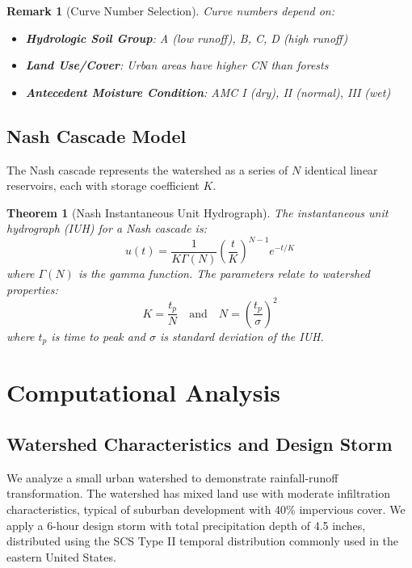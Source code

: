 \documentclass[a4paper, 11pt]{article}
\newtheorem{theorem}{Theorem}[section]
\newtheorem{remark}{Remark}[section]
\begin{document}
\begin{remark}[Curve Number Selection]
Curve numbers depend on:
\begin{itemize}
\item \textbf{Hydrologic Soil Group}: A (low runoff), B, C, D (high runoff)
\item \textbf{Land Use/Cover}: Urban areas have higher CN than forests
\item \textbf{Antecedent Moisture Condition}: AMC I (dry), II (normal), III (wet)
\end{itemize}
\end{remark}

\subsection{Nash Cascade Model}

The Nash cascade represents the watershed as a series of $N$ identical linear reservoirs,
each with storage coefficient $K$.

\begin{theorem}[Nash Instantaneous Unit Hydrograph]
The instantaneous unit hydrograph (IUH) for a Nash cascade is:
\begin{equation}
u(t) = \frac{1}{K \Gamma(N)} \left(\frac{t}{K}\right)^{N-1} e^{-t/K}
\end{equation}
where $\Gamma(N)$ is the gamma function. The parameters relate to watershed properties:
\begin{equation}
K = \frac{t_p}{N} \quad \text{and} \quad N = \left(\frac{t_p}{\sigma}\right)^2
\end{equation}
where $t_p$ is time to peak and $\sigma$ is standard deviation of the IUH.
\end{theorem}

\section{Computational Analysis}

\subsection{Watershed Characteristics and Design Storm}

We analyze a small urban watershed to demonstrate rainfall-runoff transformation.
The watershed has mixed land use with moderate infiltration characteristics, typical
of suburban development with 40\% impervious cover. We apply a 6-hour design storm
with total precipitation depth of 4.5 inches, distributed using the SCS Type II
temporal distribution commonly used in the eastern United States.
\end{document}
